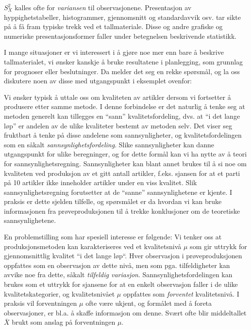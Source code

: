 \noindent $S_{X}^{2}$ kalles ofte for {\em variansen} til observasjonene.
Presentasjon av
hyppighets\-tabeller, histogrammer, gjennomsnitt og standardavvik
osv. tar sikte på å få fram typiske trekk ved et tallmateriale.
Disse og andre grafiske og numeriske presentasjonsformer
faller under betegnelsen beskrivende statistikk.

I mange situasjoner er vi interessert i å gjøre noe mer enn bare
å beskrive tallmaterialet, vi ønsker kanskje å bruke resultatene
i planlegging, som grunn\-lag for prognoser eller beslutninger.  Da
melder det seg en rekke spørsmål, og la oss diskutere noen av
disse med utgangspunkt i eksemplet ovenfor:

Vi ønsker typisk å uttale oss om kvaliteten av artikler dersom vi
fortsetter å produsere etter samme metode.  I denne forbindelse
er det naturlig å tenke seg at metoden generelt kan tillegges en
``sann'' kvalitetsfordeling, dvs. at ``i det lange løp'' er andelen
av de ulike kvaliteter bestemt av metoden selv.  Det viser seg
fruktbart å tenke på disse andelene som sannsynligheter, og
kvalitetsfordelingen som en såkalt {\em sannsynlighetsfordeling}. 
Slike sannsynligheter kan danne utgangspunkt for ulike beregninger,
og for dette formål kan vi ha nytte av å teori
for sannsynlighetsregning.  Sannsynligheter kan blant annet
brukes til å si noe om kvaliteten ved produksjon av et gitt
antall artikler, f.eks. sjansen for at et parti på 10 artikler
ikke inneholder artikler under en viss kvalitet.  Slik
sannsynlighets\-regning forutsetter at de ``sanne'' sannsynlighetene er
kjente.  I praksis er dette sjelden tilfelle, og spørsmålet er da
hvordan vi kan bruke informasjonen fra prøveproduksjonen
til å trekke konklusjoner om de teoretiske sannsynlighetene.

En problemstilling som har spesiell interesse er følgende:  Vi
tenker oss at produksjonsmetoden kan karakteriseres ved et
kvalitetsnivå $\mu$ som gir uttrykk for gjennomsnittlig kvalitet
``i det lange løp``.  Hver observasjon i prøveproduksjonen oppfattes
som en observasjon av dette nivå, men som pga. tilfeldigheter kan
avvike noe fra dette, såkalt {\em tilfeldig variasjon}. 
Sannsynlighetsfordelingen kan brukes som et uttrykk for sjansene for at
en enkelt observasjon faller i de ulike kvalitetskategorier, og     
kvalitetsnivået $\mu$ oppfattes som {\em forventet} kvalitetsnivå.  I
praksis vil forventningen $\mu$ ofte være ukjent, og formålet med å
foreta observasjoner, er bl.a. å skaffe informasjon om denne. Svært
ofte blir middeltallet $\bar{X}$ brukt som anslag på forventningen $\mu$.
       
